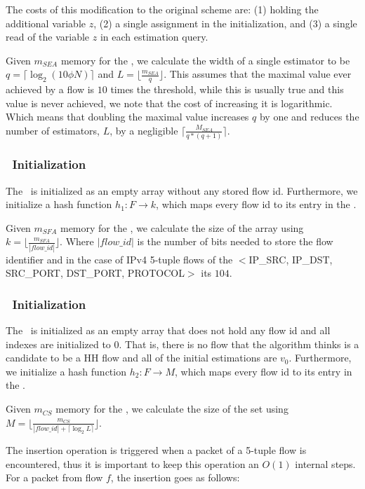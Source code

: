 The costs of this modification to the original scheme are: (1) holding the additional variable $z$, (2) a single assignment in the initialization, and (3) a single read of the variable $z$ in each estimation query.

Given $m_{SEA}$ memory for the \sea, we calculate the width of a single estimator to be $q=\lceil \log_{2}(10 \phi N)\rceil$ and $L=\lfloor \frac{m_{SEA}}{q} \rfloor$. This assumes that the maximal value ever achieved by a flow is $10$ times the threshold, while this is usually true and this value is never achieved, we note that the cost of increasing it is logarithmic. Which means that doubling the maximal value increases $q$ by one and reduces the number of estimators, $L$, by a negligible $\lceil\frac{M_{SEA}}{q*(q+1)}\rceil$.


\subsubsection{\sfa\ Initialization}
The \sfa\ is initialized as an empty array without any stored flow id. Furthermore, we initialize a hash function $h_1:F\rightarrow k$, which maps every flow id to its entry in the \sfa.

Given $m_{SFA}$ memory for the \sfa, we calculate the size of the array using $k=\lfloor \frac{m_{SFA}}{|flow\_id|} \rfloor$. Where $|flow\_id|$ is the number of bits needed to store the flow identifier and in the case of IPv4 5-tuple flows of the $<$IP\_SRC, IP\_DST, SRC\_PORT, DST\_PORT, PROTOCOL$>$ its $104$.

\subsubsection{\cs\ Initialization}
The \cs\ is initialized as an empty array that does not hold any flow id and all indexes are initialized to 0. That is, there is no flow that the algorithm thinks is a candidate to be a HH flow and all of the initial estimations are $v_0$. Furthermore, we initialize a hash function $h_2:F\rightarrow M$, which maps every flow id to its entry in the \cs.

Given $m_{CS}$ memory for the \cs, we calculate the size of the set using $M=\lfloor \frac{m_{CS}}{|flow\_id| + \lceil \log_2{L} \rceil} \rfloor$.

The insertion operation is triggered when a packet of a 5-tuple flow is encountered, thus it is important to keep this operation an $O(1)$ internal steps. For a packet from flow $f$, the insertion goes as follows:

